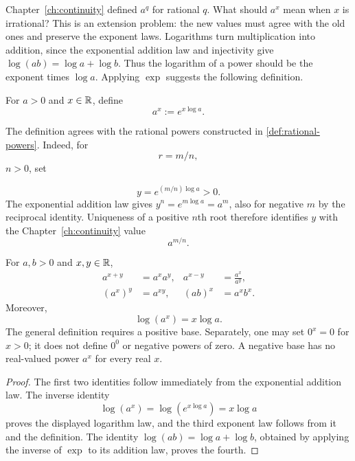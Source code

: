 Chapter~\ref{ch:continuity} defined $a^q$ for rational $q$. What should
$a^x$ mean when $x$ is irrational? This is an extension problem: the new
values must agree with the old ones and preserve the exponent laws.
Logarithms turn multiplication into addition, since the exponential addition
law and injectivity give $\log(ab)=\log a+\log b$. Thus the logarithm of a
power should be the exponent times $\log a$. Applying $\exp$ suggests the
following definition.

\begin{definition}
For \(a>0\) and \(x\in\mathbb{R}\), define
\[
\boxed{a^x:=e^{x\log a}.}
\]
\end{definition}

The definition agrees with the rational powers constructed in
\cref{def:rational-powers}. Indeed, for
\[
r=m/n,
\]
 \(n>0\), set

\[
y=e^{(m/n)\log a}>0.
\]
 The exponential addition law gives
\(y^n=e^{m\log a}=a^m\), also for negative \(m\) by the reciprocal
identity. Uniqueness of a positive \(n\)th root therefore identifies \(y\)
with the Chapter~\ref{ch:continuity} value
\[
a^{m/n}.
\]


\begin{proposition}
\label{prop:real-exponent-laws}
For \(a,b>0\) and \(x,y\in\mathbb{R}\),
\[
\begin{aligned}
a^{x+y}&=a^xa^y,& a^{x-y}&=\frac{a^x}{a^y},\\
(a^x)^y&=a^{xy},& (ab)^x&=a^xb^x.
\end{aligned}
\]
Moreover,
\[
\boxed{\log(a^x)=x\log a.}
\]
The general definition requires a positive base. Separately, one may set
\(0^x=0\) for \(x>0\); it does not define \(0^0\) or negative powers of
zero. A negative base has no real-valued power \(a^x\) for every real \(x\).
\end{proposition}
\begin{proof}
The first two identities follow immediately from the exponential addition
law. The inverse identity
\[
\log(a^x)=\log(e^{x\log a})=x\log a
\]
proves the displayed logarithm law, and the third exponent law follows from
it and the definition.
The identity \(\log(ab)=\log a+\log b\), obtained by applying the inverse of
\(\exp\) to its addition law, proves the fourth.
\end{proof}

